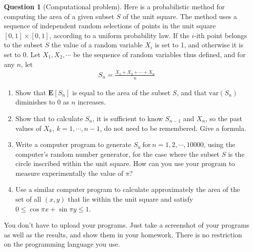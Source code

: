 \documentclass[utf8]{article}
\theoremstyle{definition}%
\newtheorem{question}{Question} %
\theoremstyle{plain}%
\begin{document}
\begin{question}[Computational problem]
    Here is a probabilistic method for computing the area of a given subset $S$ of the unit square. The method uses a sequence of independent random selections of points in the unit square $[0, 1] \times [0, 1]$, according to a uniform probability law. If the $i$-ith point belongs to the subset $S$ the value of a random variable $X_i$ is set to 1, and otherwise it is set to 0. Let $X_1, X_2, \cdots$ be the sequence of random variables thus defined, and for any $n$, let
    \begin{align}
        S_n = \frac{X_1 + X_2 + \cdots + X_n}{n}
    \end{align}
    \begin{enumerate}
        \item Show that $\mathbf{E}[S_n]$ is equal to the area of the subset $S$, and that $\text{var}(S_n)$ diminishes to 0 as $n$ increases.
        \item Show that to calculate $S_n$, it is sufficient to know $S_{n-1}$ and $X_n$, so the past values of $X_k,~k=1,\cdots,n-1$, do not need to be remembered. Give a formula.
        \item Write a computer program to generate $S_n~\text{for}~n = 1, 2, \cdots, 10000$, using the computer's random number generator, for the case where the subset $S$ is the circle inscribed within the unit square. How can you use your program to measure experimentally the value of $\pi$?
        \item Use a similar computer program to calculate approximately the area of the set of all $(x,y)$ that lie within the unit square and satisfy $0 \leq \cos\pi x + \sin\pi y \leq 1$.
    \end{enumerate}
    You don't have to upload your programs. Just take a screenshot of your programs as well as the results, and show them in your homework. There is no restriction on the programming language you use.
\end{question}
\end{document}
